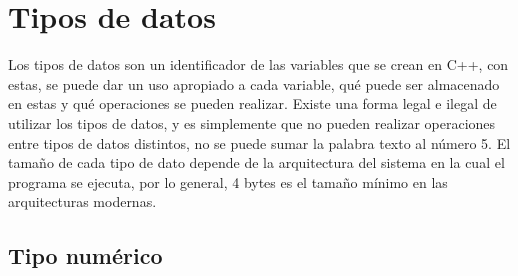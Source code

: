 \section{Tipos de datos}

Los tipos de datos son un identificador de las variables que se crean en C++, con estas, se puede dar un uso apropiado a cada variable, qué puede ser almacenado en estas y qué operaciones se pueden realizar. Existe una forma legal e ilegal de utilizar los tipos de datos, y es simplemente que no pueden realizar operaciones entre tipos de datos distintos, no se puede sumar la palabra texto al número 5. El tamaño de cada tipo de dato depende de la arquitectura del sistema en la cual el programa se ejecuta, por lo general, 4 bytes es el tamaño mínimo en las arquitecturas modernas.


\subsection{Tipo numérico}

